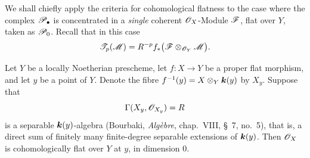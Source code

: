 We shall chiefly apply the criteria for cohomological
flatness to the case where the complex $\mathscr{P}_\bullet$ is
concentrated in a \emph{single} coherent
$\mathscr{O}_X$-Module $\mathscr{F}$, flat over $Y$, taken as
$\mathscr{P}_0$.  Recall that in this case
\[
  \mathscr{T}_p(\mathscr{M})
  =R^{-p}f_*
    \bigl(\mathscr{F}\otimes_{\mathscr{O}_Y}\mathscr{M}\bigr).
\]

\begin{proposition}[7.8.6]
\label{III.7.8.6}
Let $Y$ be a locally Noetherian prescheme, let
$f:X\to Y$ be a proper flat morphism, and let $y$ be a point
of $Y$.  Denote the fibre
$f^{-1}(y)=X\otimes_Y\boldsymbol{k}(y)$ by $X_y$.  Suppose that
\[
  \Gamma(X_y,\mathscr{O}_{X_y})=R
\]
is a separable $\boldsymbol{k}(y)$-algebra (Bourbaki,
\emph{Alg\`ebre}, chap.~VIII, \S~7, no.~5), that is, a
direct sum of finitely many finite-degree separable
extensions of $\boldsymbol{k}(y)$.  Then $\mathscr{O}_X$ is
cohomologically flat over $Y$ at $y$, in dimension $0$.
\end{proposition}

